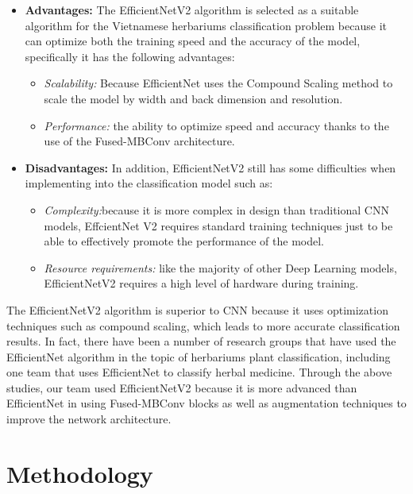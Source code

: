 \documentclass[conference]{IEEEtran}
\begin{document}
\begin{itemize}
    \item \textbf{Advantages:}
    The EfficientNetV2 algorithm is selected as a suitable algorithm for the Vietnamese herbariums classification problem because it can optimize both the training speed and the accuracy of the model, specifically it has the following advantages:
    \begin{itemize}
        \item \textit{Scalability:} Because EfficientNet uses the Compound Scaling method to scale the model by width and back dimension and resolution.
        \item \textit{Performance:} the ability to optimize speed and accuracy thanks to the use of the Fused-MBConv architecture.
        
    \end{itemize}
    \item \textbf{Disadvantages:}
    In addition, EfficientNetV2 still has some difficulties when implementing into the classification model such as:
    \begin{itemize}
        \item \textit{Complexity:}because it is more complex in design than traditional CNN models, EffcientNet V2 requires standard training techniques just to be able to effectively promote the performance of the model.
        \item \textit{Resource requirements:} like the majority of other Deep Learning models, EfficientNetV2 requires a high level of hardware during training.
    \end{itemize}
\end{itemize}



The EfficientNetV2 algorithm is superior to CNN because it uses optimization techniques such as compound scaling, which leads to more accurate classification results. In fact, there have been a number of research groups that have used the EfficientNet algorithm in the topic of herbariums plant classification, including one team that uses EfficientNet\cite{r5} to classify herbal medicine. Through the above studies, our team used EfficientNetV2 because it is more advanced than EfficientNet in using Fused-MBConv blocks as well as augmentation techniques to improve the network architecture.           


\section{Methodology}
\end{document}
